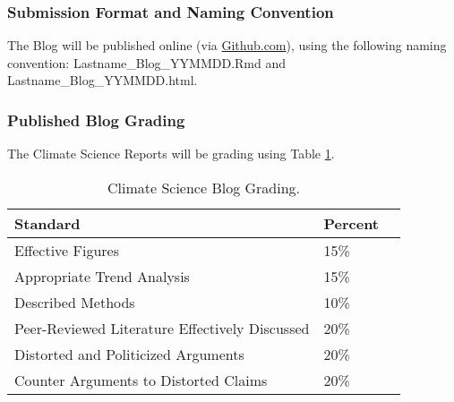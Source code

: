 \subsubsection{Submission Format and Naming Convention}

The Blog will be published online (via \url{Github.com}), using the following naming convention: Lastname\_Blog\_YYMMDD.Rmd and Lastname\_Blog\_YYMMDD.html. 

\subsubsection{Published Blog Grading}

The Climate Science Reports will be grading using Table \ref{tab:bloggrading}. 

\begin{table}[h]
\caption{Climate Science Blog Grading.}
\label{tab:bloggrading}
\begin{tabular}{lll}\hline
Standard      &   Percent   & \\ \hline\hline
Effective Figures   & 15\%    & \\
Appropriate Trend Analysis    & 15\% & \\
Described Methods             & 10\% & \\
Peer-Reviewed Literature Effectively Discussed & 20\% & \\
Distorted and Politicized Arguments           & 20\% & \\
Counter Arguments to Distorted Claims         & 20\% & \\
\hline
\end{tabular}
\end{table}

